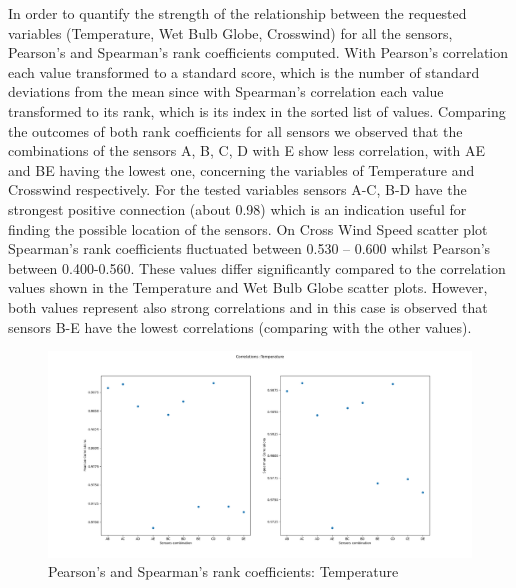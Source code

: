 \documentclass[a4paper]{article}
\begin{document}
            In order to quantify the strength of the relationship between the requested variables (Temperature, Wet Bulb Globe, Crosswind) for all the sensors, Pearson’s and Spearman’s rank coefficients computed. 
            With Pearson’s correlation each value transformed to a standard score, which is the number of standard deviations from the mean since with Spearman’s correlation each value transformed to its rank, which is its index in the sorted list of values. 
            Comparing the outcomes of both rank coefficients for all sensors we observed that the combinations of the sensors A, B, C, D with E show less correlation, with AE and BE having the lowest one, concerning the variables of Temperature and Crosswind respectively. For the tested variables sensors A-C, B-D have the strongest positive connection (about 0.98) which is an indication useful for finding the possible location of the sensors. 
            On Cross Wind Speed scatter plot Spearman’s rank coefficients fluctuated between 0.530 – 0.600 whilst Pearson’s between 0.400-0.560. These values differ significantly compared to the correlation values shown in the Temperature and Wet Bulb Globe scatter plots. However, both values represent also strong correlations and in this case is observed that sensors B-E have the lowest correlations (comparing with the other values).

            \begin{figure}[H]
            \centering
                \includegraphics[width=\textwidth]{images/Correlation_Temperature.png}
                \caption{Pearson’s and Spearman’s rank coefficients: Temperature}
                \label{fig:Correlations}
            \end{figure}
\end{document}
